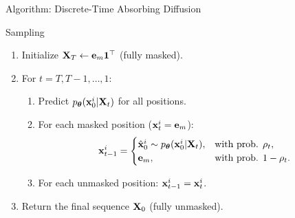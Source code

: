 \documentclass{beamer}
\begin{document}
\begin{frame}{Algorithm: Discrete-Time Absorbing Diffusion}
	\begin{block}{Sampling}
		\begin{enumerate}
			\item Initialize $\mathbf{X}_T \leftarrow \mathbf e_m \mathbf 1^\top$ (fully masked).
			\item For $t = T, T-1, \ldots, 1$:
			\begin{enumerate}
				\item Predict $p_{\boldsymbol{\theta}}(\mathbf{x}_0^i | \mathbf{X}_t)$ for all positions.
				\item For each masked position ($\mathbf{x}_t^i = \mathbf e_m$):
				\vspace{-0.3cm}
				\[
					\mathbf{x}_{t-1}^i =
					\begin{cases}
						\hat{\mathbf{x}}_0^i \sim p_{\boldsymbol{\theta}}(\mathbf{x}_0^i | \mathbf{X}_t), & \text{with prob. } \rho_t,\\
						\mathbf e_m, & \text{with prob. } 1-\rho_t.
					\end{cases}
				\]
				\vspace{-0.5cm}
				\item For each unmasked position: $\mathbf{x}_{t-1}^i = \mathbf{x}_t^i$.
			\end{enumerate}
			\item Return the final sequence $\mathbf{X}_0$ (fully unmasked).
		\end{enumerate}
	\end{block}
\end{frame}
\end{document}
